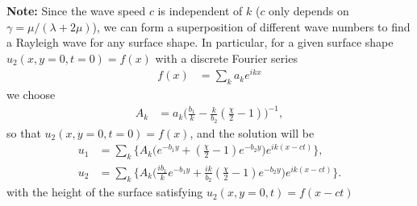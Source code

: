 {\bf Note:} Since the wave speed $c$ is independent of $k$ ($c$ only depends on $\gamma=\mu/(\lambda+2\mu)$), 
  we can form a superposition of different wave numbers to find a Rayleigh wave for any surface shape.
In particular, for a given surface shape $u_2(x,y=0,t=0)=f(x)$ with a discrete Fourier series 
\begin{align}
  f(x) &= \sum_k a_k e^{ikx} 
\end{align} 
we choose
\begin{align}
  A_k &= a_k \Big( \frac{b_1}{k}  - \frac{k}{b_2} (\frac{\chi}{2}-1) \Big)^{-1},
\end{align}
so that $u_2(x,y=0,t=0)=f(x)$, and the solution will be 
\begin{align}
 u_1 &= \sum_k \Big\{ A_k \Big( e^{-b_1 y } + (\frac{\chi}{2}-1) e^{-b_2 y } \Big) e^{ik(x-ct)} \Big\} ,  \\
 u_2 &= \sum_k \Big\{ A_k \Big( \frac{i b_1}{k} e^{-b_1 y } + \frac{i k}{b_2} (\frac{\chi}{2}-1) e^{-b_2 y } \Big) e^{ik(x-ct)} \Big\}. 
\end{align}
with the height of the surface satisfying $u_2(x,y=0,t)=f(x-c t)$